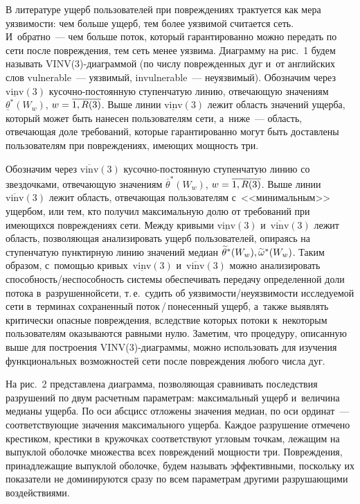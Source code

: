 \begin{multicols}{2}
В литературе ущерб пользователей при по\-вреж\-де\-ни\-ях трактуется как мера уязвимости: 
чем больше ущерб, тем более уязвимой считается сеть. 
И~обратно~--- чем больше поток, который гарантированно можно передать по сети 
после повреждения, тем сеть менее уязвима. Диаграмму на рис.~1 
будем называть VINV(3)-диа\-грам\-мой (по числу поврежденных дуг и~от 
английских слов vulnerable~--- уязвимый, invulnerable~---  неуязвимый). 
Обозначим через~$\underline {\mathrm{vinv}}(3)$ ку\-соч\-но-по\-сто\-ян\-ную 
ступенчатую линию, отвечающую значениям $\underline {\theta}^*(W_w)$, 
$w \hm= \overline{1, R(3)}$. Выше линии  $\underline {\mathrm{vinv}}(3)$  
лежит область значений ущерба, который может быть нанесен 
пользователям сети, а~ниже~--- область, отвечающая доле требований, которые 
гарантированно могут быть до\-став\-ле\-ны пользователям при повреждениях,
 имеющих мощность три.

Обозначим через $\overline {\mathrm{vinv}}(3)$ ку\-соч\-но-по\-сто\-ян\-ную 
ступенчатую линию со звездочками, отвечающую значениям $\overline {\theta}^*(W_w)$, 
$w \hm= \overline{1, R(3)}$.
Выше линии~$\overline {\mathrm{vinv}}(3)$ лежит область, отвечающая пользователям 
с~<<минимальным>>  ущербом, или тем, кто получил максимальную долю от 
требований при имеющихся повреждениях сети. Между кривыми $\underline {\mathrm{vinv}}(3)$ 
и~$\overline {\mathrm{vinv}}(3)$ лежит область, поз\-во\-ля\-ющая анализировать  ущерб пользователей, 
опираясь на ступенчатую пунктирную линию значений медиан 
$\widetilde {\theta}^*(W_w), \widetilde {\omega}^*(W_w)$. Таким образом, 
с~по\-мощью кривых~$\underline {\mathrm{vinv}}(3)$ и~$\overline {\mathrm{vinv}}(3)$ 
можно анализировать спо\-соб\-ность/не\-спо\-соб\-ность системы обеспечивать передачу 
определенной доли потока в~разрушенной\linebreak сети, т.\,е.\
 судить об уяз\-ви\-мости/не\-уяз\-ви\-мости исследуемой сети в~терминах 
 сохраненный по\-ток\,/\,по\-не\-сен\-ный ущерб, а~также выявлять критически  опасные 
 повреждения, вследствие которых  потоки к~некоторым пользователям оказываются  
 равными нулю. Заметим, что процедуру, описанную выше для построения 
 VINV(3)-диаграммы, можно использовать для изучения функциональных возможностей 
 сети после повреждения любого числа дуг.
 {
 
 }
 




На рис.~2 представлена диаграмма, поз\-во\-ля\-ющая сравнивать последствия 
разрушений по двум расчетным  параметрам:  максимальный ущерб  и~величина  
медианы ущерба. По оси абсцисс отложены значения медиан, по оси ординат~--- 
соответствующие значения максимального ущерба. Каждое разрушение  отмечено   
крестиком,  крестики в~кружочках соответствуют  угловым точкам, лежащим на 
выпуклой оболочке множества всех повреждений мощности три. Повреждения, 
принадлежащие выпуклой оболочке, будем называть эффективными, поскольку 
их показатели  не доминируются  сразу по всем параметрам другими 
разрушающими воздействиями.


\end{multicols}
